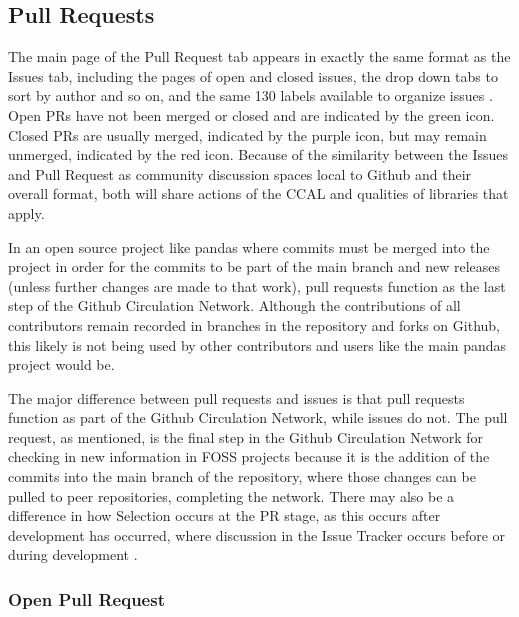 \subsection{Pull Requests}

The main page of the Pull Request tab appears in exactly the same format as the Issues tab, including the pages of open and closed issues, the drop down tabs to sort by author and so on, and the same 130 labels available to organize issues \cite{pandasrepo}. Open PRs have not been merged or closed and are indicated by the green icon. Closed PRs are usually merged, indicated by the purple icon, but may remain unmerged, indicated by the red icon. Because of the similarity between the Issues and Pull Request as community discussion spaces local to Github and their overall format, both will share actions of the CCAL and qualities of libraries that apply. 

In an open source project like pandas where commits must be merged into the project in order for the commits to be part of the main branch and new releases (unless further changes are made to that work), pull requests function as the last step of the Github Circulation Network. Although the contributions of all contributors remain recorded in branches in the repository and forks on Github, this likely is not being used by other contributors and users like the main pandas project would be. 

The major difference between pull requests and issues is that pull requests function as part of the Github Circulation Network, while issues do not. The pull request, as mentioned, is the final step in the Github Circulation Network for checking in new information in FOSS projects because it is the addition of the commits into the main branch of the repository, where those changes can be pulled to peer repositories, completing the network. There may also be a difference in how Selection occurs at the PR stage, as this occurs after development has occurred, where discussion in the Issue Tracker occurs before or during development \cite{gorman2000values}\cite{rubin2016foundationslis}. 

\subsubsection{Open Pull Request}

